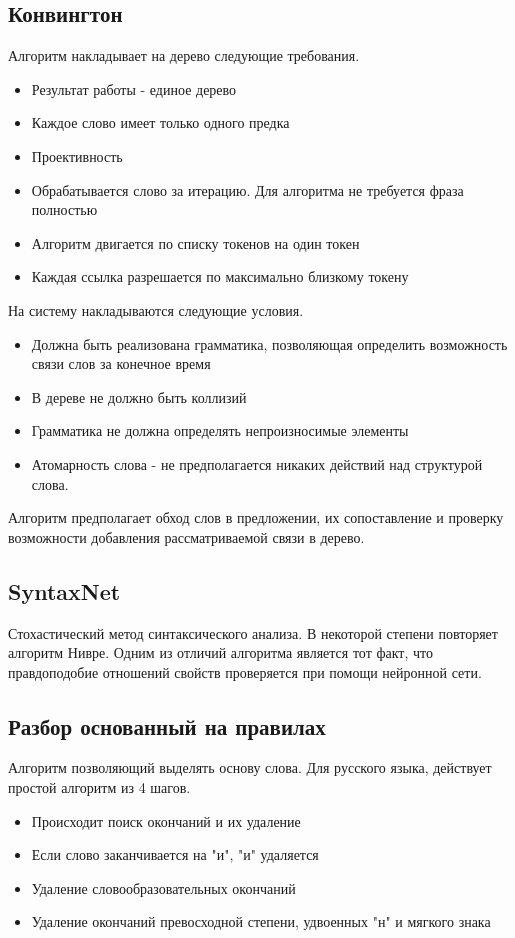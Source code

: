 \subsection{Конвингтон}
Алгоритм накладывает на дерево следующие требования.
\begin{itemize}
\item Результат работы - единое дерево
\item Каждое слово имеет только одного предка
\item Проективность
\item Обрабатывается слово за итерацию. Для алгоритма не требуется фраза полностью
\item Алгоритм двигается по списку токенов на один токен
\item Каждая ссылка разрешается по максимально близкому токену
\end{itemize}
На систему накладываются следующие условия.
\begin{itemize}
\item Должна быть реализована грамматика, позволяющая определить возможность связи слов за конечное время
\item В дереве не должно быть коллизий
\item Грамматика не должна определять непроизносимые элементы
\item Атомарность слова - не предполагается никаких действий над структурой слова.
\end{itemize}
Алгоритм предполагает обход слов в предложении, их сопоставление и проверку возможности добавления рассматриваемой связи в дерево.
\cite{Covington}
\subsection{SyntaxNet}
Стохастический метод синтаксического анализа. 
В некоторой степени повторяет алгоритм Нивре.
Одним из отличий алгоритма является тот факт, что правдоподобие отношений свойств проверяется при помощи нейронной сети.
\cite{SyntaxNet}

\subsection{Разбор основанный на правилах}
Алгоритм позволяющий выделять основу слова. Для русского языка, действует простой алгоритм из 4 шагов.
\begin{itemize}
\item Происходит поиск окончаний и их удаление
\item Если слово заканчивается на "и", "и" удаляется
\item Удаление словообразовательных окончаний
\item Удаление окончаний превосходной степени, удвоенных "н" и мягкого знака
\end{itemize}\cite{SnowBall}

